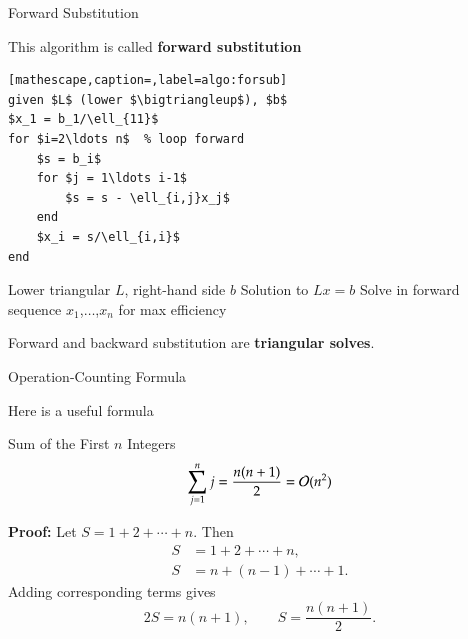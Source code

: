 \documentclass[10pt]{beamer}
\begin{document}
\begin{frame}[fragile]{Forward Substitution}

This algorithm is called \textbf{forward substitution} 
\begin{lstlisting}[mathescape,caption=,label=algo:forsub]
given $L$ (lower $\bigtriangleup$), $b$               
$x_1 = b_1/\ell_{11}$           
for $i=2\ldots n$  % loop forward        
    $s = b_i$                 
    for $j = 1\ldots i-1$    
        $s = s - \ell_{i,j}x_j$   
    end                      
    $x_i = s/\ell_{i,i}$          
end                          
\end{lstlisting}

{Lower triangular $L$, right-hand side $b$}
{Solution to $Lx=b$}
{Solve in forward sequence $x_1$,$\ldots$,$x_n$ for max efficiency}

Forward and backward substitution are \textbf{triangular solves}.

\end{frame}


\begin{frame}{Operation-Counting Formula}

{
}


Here is a useful formula
\begin{block}{Sum of the First $n$ Integers}
     $$\sum_{j=1}^{n} j =  \frac{ n(n+1)}{2} = {\mathcal{O}}(n^2)$$
\end{block}

\textbf{Proof:}
Let $S=1+2+\cdots+n$. Then
\[
\begin{aligned}
    S &= 1+2+\cdots+n,\\
    S &= n+(n-1)+\cdots+1.
\end{aligned}
\]
Adding corresponding terms gives
\[
    2S=n(n+1),
    \qquad
    S=\frac{n(n+1)}{2}.
\]
\end{frame}
\end{document}
